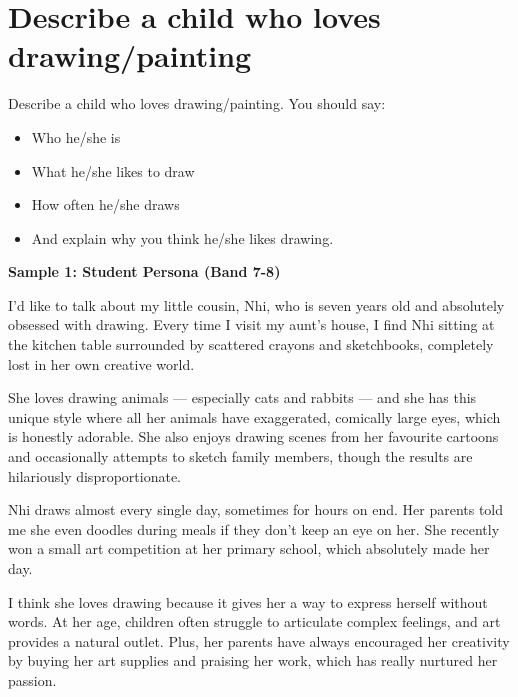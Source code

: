 \newpage

\section{Describe a child who loves drawing/painting}
\begin{ieltsprompt}
Describe a child who loves drawing/painting.
You should say:
\begin{itemize}[leftmargin=2em, itemsep=2pt]
\item Who he/she is
\item What he/she likes to draw
\item How often he/she draws
\item And explain why you think he/she likes drawing.
\end{itemize}
\end{ieltsprompt}
\begin{ieltsanswer}
\textbf{Sample 1: Student Persona (Band 7-8)}

I'd like to talk about my little cousin, Nhi, who is seven years old and absolutely obsessed with drawing. Every time I visit my aunt's house, I find Nhi sitting at the kitchen table surrounded by scattered crayons and sketchbooks, completely lost in her own creative world.

She loves drawing animals — especially cats and rabbits — and she has this unique style where all her animals have exaggerated, comically large eyes, which is honestly adorable. She also enjoys drawing scenes from her favourite cartoons and occasionally attempts to sketch family members, though the results are hilariously disproportionate.

Nhi draws almost every single day, sometimes for hours on end. Her parents told me she even doodles during meals if they don't keep an eye on her. She recently won a small art competition at her primary school, which absolutely made her day.

I think she loves drawing because it gives her a way to express herself without words. At her age, children often struggle to articulate complex feelings, and art provides a natural outlet. Plus, her parents have always encouraged her creativity by buying her art supplies and praising her work, which has really nurtured her passion.
\end{ieltsanswer}


